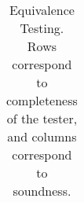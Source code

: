 \begin{table}[t]
{\begin{tabular}{| c | c | c | c | c | c |}
  \hline
\end{tabular}}
\caption{Equivalence Testing. Rows correspond to completeness of the tester, and columns correspond to soundness.}
\label{tab:eq}
\end{table}
\egroup

